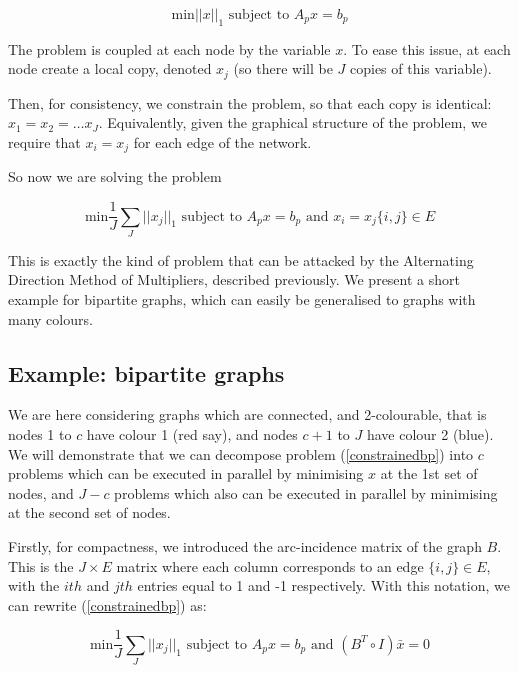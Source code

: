 \begin{equation}
\text{min} ||x||_1 \text{ subject to } A_p x = b_p
\end{equation}

The problem is coupled at each node by the variable \(x\). To ease this issue, at each node create a local copy, denoted \(x_j\) (so there will be \(J\) copies of this variable). 

Then, for consistency, we constrain the problem, so that each copy is identical: \(x_1 = x_2 = \ldots x_J\). Equivalently, given the graphical structure of the problem, we require that \(x_i = x_j\) for each edge of the network.

So now we are solving the problem

\begin{equation}
\text{min} \frac{1}{J}\sum_J||x_j||_1 \text{ subject to } A_p x = b_p \text{ and } x_i = x_j \{i,j\} \in E 
 \label{constrainedbp}
\end{equation}
 
This is exactly the kind of problem that can be attacked by the Alternating Direction Method of Multipliers, described previously. We present a short example for bipartite graphs, which can easily be generalised to graphs with many colours. 
 
\subsection{Example: bipartite graphs}
We are here considering graphs which are connected, and 2-colourable, that is nodes 1 to \(c\) have colour 1 (red say), and nodes \(c+1\) to \(J\) have colour 2 (blue). We will demonstrate that we can decompose problem (\ref{constrainedbp}) into \(c\) problems which can be executed in parallel by minimising \(x\) at the 1st set of nodes, and \(J - c\) problems which also can be executed in parallel by minimising at the second set of nodes. 

Firstly, for compactness, we introduced the arc-incidence matrix of the graph \(B\). This is the \(J \times E\) matrix where each column corresponds to an edge \(\{i,j\} \in E\), with the \(ith\) and \(jth\) entries equal to 1 and -1 respectively. With this notation, we can rewrite (\ref{constrainedbp}) as:

\begin{equation}
\text{min} \frac{1}{J}\sum_J||x_j||_1 \text{ subject to } A_p x = b_p \text{ and } \left(B^T \circ I \right)\bar{x} = 0 
 \label{constrainedbp1}
\end{equation}

